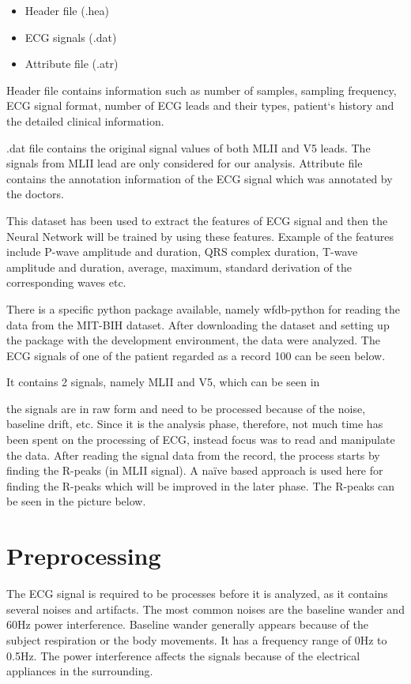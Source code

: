 \begin{itemize}
	\item Header file (.hea)
	\item ECG signals (.dat)
	\item Attribute file (.atr)
\end{itemize}

Header file contains information such as number of samples, sampling
frequency, ECG signal format, number of ECG leads and their types, patient`s history and the detailed clinical information.

.dat file contains the original signal values of both MLII and V5 leads. The signals from MLII lead are only considered for our analysis. Attribute file contains the annotation information of the ECG signal which was annotated by the doctors.

This dataset has been used to extract the features of ECG signal and then the Neural Network will be trained by using these features. Example of the features include P-wave amplitude and duration, QRS complex duration, T-wave amplitude and duration, average, maximum, standard derivation of the corresponding waves etc. 


There is a specific python package available, namely wfdb-python for reading the data from the MIT-BIH dataset. After downloading the dataset and setting up the package with the development environment, the data were analyzed. The ECG signals of one of the patient regarded as a record 100 can be seen below.


It contains 2 signals, namely MLII and V5, which can be seen in

the signals are in raw form and need to be processed because of the noise, baseline drift, etc. Since it is the analysis phase, therefore, not much time has been spent on the processing of ECG, instead focus was to read and manipulate the data. 
After reading the signal data from the record, the process starts by finding the R-peaks (in MLII signal). A naïve based approach is used here for finding the R-peaks which will be improved in the later phase. The R-peaks can be seen in the picture below.




\section{Preprocessing}
The ECG signal is required to be processes before it is analyzed, as it contains several noises and artifacts. The most common noises are the baseline wander and 60Hz power interference. Baseline wander generally appears because of the subject respiration or the body movements. It has a frequency range of 0Hz to 0.5Hz. The power interference affects the signals because of the electrical appliances in the surrounding.

